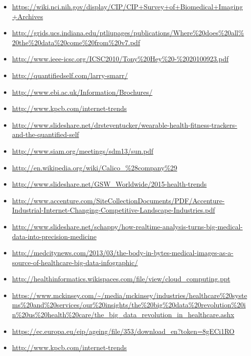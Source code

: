 \begin{itemize}
\item
  \url{https://wiki.nci.nih.gov/display/CIP/CIP+Survey+of+Biomedical+Imaging+Archives}
\item
  \url{http://grids.ucs.indiana.edu/ptliupages/publications/Where\%20does\%20all\%20the\%20data\%20come\%20from\%20v7.pdf}
\item
  \url{http://www.ieee-icsc.org/ICSC2010/Tony\%20Hey\%20-\%2020100923.pdf}
\item
  \url{http://quantifiedself.com/larry-smarr/}
\item
  \url{http://www.ebi.ac.uk/Information/Brochures/}
\item
  \url{http://www.kpcb.com/internet-trends}
\item
  \url{http://www.slideshare.net/drsteventucker/wearable-health-fitness-trackers-and-the-quantified-self}
\item
  \url{http://www.siam.org/meetings/sdm13/sun.pdf}
\item
  \url{http://en.wikipedia.org/wiki/Calico_\%28company\%29}
\item
  \url{http://www.slideshare.net/GSW_Worldwide/2015-health-trends}
\item
  \url{http://www.accenture.com/SiteCollectionDocuments/PDF/Accenture-Industrial-Internet-Changing-Competitive-Landscape-Industries.pdf}
\item
  \url{http://www.slideshare.net/schappy/how-realtime-analysis-turns-big-medical-data-into-precision-medicine}
\item
  \url{http://medcitynews.com/2013/03/the-body-in-bytes-medical-images-as-a-source-of-healthcare-big-data-infographic/}
\item
  \url{http://healthinformatics.wikispaces.com/file/view/cloud_computing.ppt}
\item
  \url{https://www.mckinsey.com/~/media/mckinsey/industries/healthcare%20systems%20and%20services/our%20insights/the%20big%20data%20revolution%20in%20us%20health%20care/the_big_data_revolution_in_healthcare.ashx}
\begin{comment}
\item
  \url{https://partner.microsoft.com/download/global/40193764}
\end{comment}
\item
  \url{https://ec.europa.eu/eip/ageing/file/353/download_en?token=8gECi1RO}
\item
  \url{http://www.kpcb.com/internet-trends}
\begin{comment}

\end{comment}
\end{itemize}
